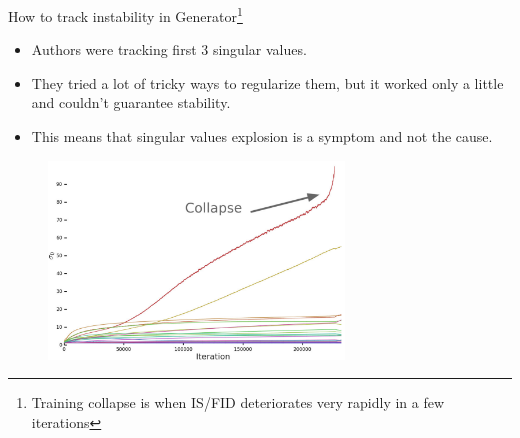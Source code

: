 \documentclass[10pt]{beamer}
\begin{document}
\begin{frame}{How to track instability in Generator\footnote{Training collapse is when IS/FID deteriorates very rapidly in a few iterations}}
    \begin{itemize}
        \item \pause Authors were tracking first 3 singular values.
        \item \pause They tried a lot of tricky ways to regularize them, but it worked only a little and couldn't guarantee stability.
        \item \pause This means that singular values explosion is a symptom and not the cause.
    \end{itemize}
    
    \begin{figure}
        \centering
        \includegraphics[width=0.7\textwidth]{images/biggan-singular-values-generator}
    \end{figure}
\end{frame}
\end{document}
